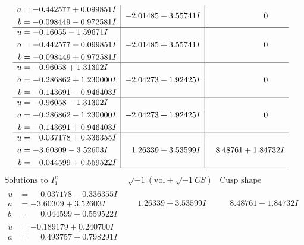 \documentclass[1p]{elsarticle_modified}
\theoremstyle{definition}
\newcommand{\I}{\sqrt{-1}}
\begin{document}
$$\begin{array}{c|c|c}
\begin{aligned}
a &= -0.442577 + 0.099851 I \\
b &= -0.098449 - 0.972581 I\end{aligned}
 & -2.01485 - 3.55741 I & \phantom{-0.000000 } 0 \\ \hline\begin{aligned}
u &= -0.16055 - 1.59671 I \\
a &= -0.442577 - 0.099851 I \\
b &= -0.098449 + 0.972581 I\end{aligned}
 & -2.01485 + 3.55741 I & \phantom{-0.000000 } 0 \\ \hline\begin{aligned}
u &= -0.96058 + 1.31302 I \\
a &= -0.286862 + 1.230000 I \\
b &= -0.143691 - 0.946403 I\end{aligned}
 & -2.04273 - 1.92425 I & \phantom{-0.000000 } 0 \\ \hline\begin{aligned}
u &= -0.96058 - 1.31302 I \\
a &= -0.286862 - 1.230000 I \\
b &= -0.143691 + 0.946403 I\end{aligned}
 & -2.04273 + 1.92425 I & \phantom{-0.000000 } 0 \\ \hline\begin{aligned}
u &= \phantom{-}0.037178 + 0.336355 I \\
a &= -3.60309 - 3.52603 I \\
b &= \phantom{-}0.044599 + 0.559522 I\end{aligned}
 & \phantom{-}1.26339 - 3.53599 I & \phantom{-}8.48761 + 1.84732 I\\
 \hline 
 \end{array}$$\newpage$$\begin{array}{c|c|c}  
\text{Solutions to }I^u_{1}& \I (\text{vol} + \sqrt{-1}CS) & \text{Cusp shape}\\
 \hline 
\begin{aligned}
u &= \phantom{-}0.037178 - 0.336355 I \\
a &= -3.60309 + 3.52603 I \\
b &= \phantom{-}0.044599 - 0.559522 I\end{aligned}
 & \phantom{-}1.26339 + 3.53599 I & \phantom{-}8.48761 - 1.84732 I \\ \hline\begin{aligned}
u &= -0.189179 + 0.240700 I \\
a &= \phantom{-}0.493757 + 0.798291 I \\

\end{aligned}
\end{array}$$
\end{document}
